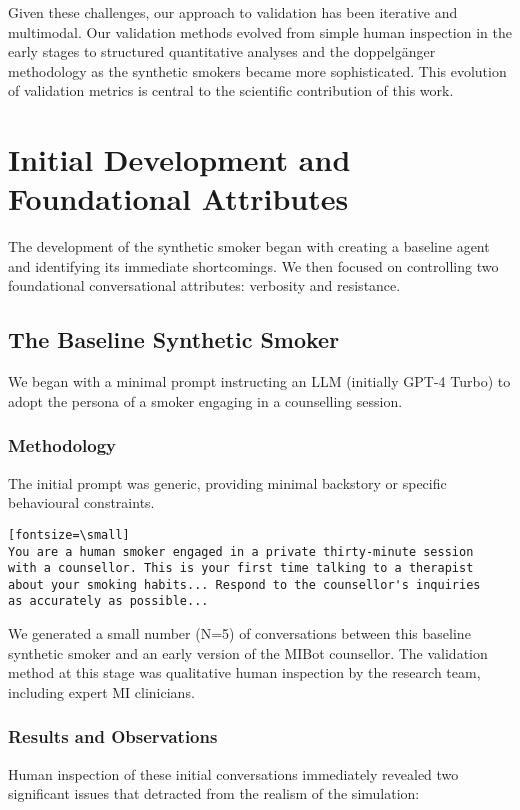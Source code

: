 Given these challenges, our approach to validation has been iterative and multimodal. Our validation methods evolved from simple human inspection in the early stages to structured quantitative analyses and the doppelgänger methodology as the synthetic smokers became more sophisticated. This evolution of validation metrics is central to the scientific contribution of this work.

\section{Initial Development and Foundational Attributes}
\label{sec:synthetic-smoker-foundational}

The development of the synthetic smoker began with creating a baseline agent and identifying its immediate shortcomings. We then focused on controlling two foundational conversational attributes: verbosity and resistance.

\subsection{The Baseline Synthetic Smoker}
\label{sec:synthetic-smoker-baseline}

We began with a minimal prompt instructing an LLM (initially GPT-4 Turbo) to adopt the persona of a smoker engaging in a counselling session.

\subsubsection{Methodology}
The initial prompt was generic, providing minimal backstory or specific behavioural constraints.
\begin{verbatim}[fontsize=\small]
You are a human smoker engaged in a private thirty-minute session
with a counsellor. This is your first time talking to a therapist
about your smoking habits... Respond to the counsellor's inquiries
as accurately as possible...
\end{verbatim}

We generated a small number (N=5) of conversations between this baseline synthetic smoker and an early version of the MIBot counsellor. The validation method at this stage was qualitative human inspection by the research team, including expert MI clinicians.

\subsubsection{Results and Observations}
Human inspection of these initial conversations immediately revealed two significant issues that detracted from the realism of the simulation:

